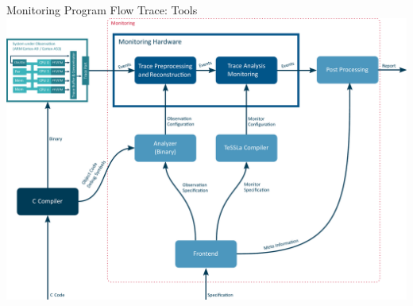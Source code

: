 
\begin{frame}[plain]{Monitoring Program Flow Trace: Tools}
  \centering
  \includegraphics[width=.9\textwidth]{content/chapter_hardware_srv/overview-program-trace.pdf}
\end{frame}

